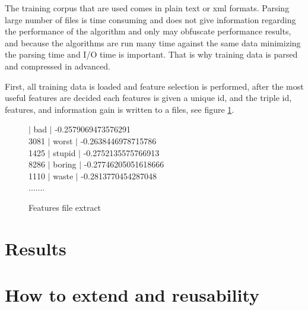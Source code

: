 \documentclass{report}
\begin{document}
The training corpus that are used comes in plain text or xml formats. Parsing large number of files is time consuming and does not give information regarding the performance of the algorithm and only may obfuscate performance results, and because the algorithms are run many time against the same data minimizing the parsing time and I/O time is important. That is why training data is parsed and compressed in advanced.

First, all training data is loaded and feature selection is performed, after the most useful features are decided each features is given a unique id, and the triple id, features, and information gain is written to a files, see figure \ref{featureextract}.

\begin{figure}[h!]
 \label{featureextract}
   $|$ bad $|$ -0.2579069473576291 \\
3081 $|$ worst $|$ -0.2638446978715786  \\
1425 $|$ stupid $|$ -0.2752135575766913 \\
8286 $|$ boring $|$ -0.27746205051618666 \\
1110 $|$ waste $|$ -0.2813770454287048 \\
.......
  \caption{Features file extract}
\end{figure}

\chapter{Results}

\chapter{How to extend and reusability}

{}

\end{document}
